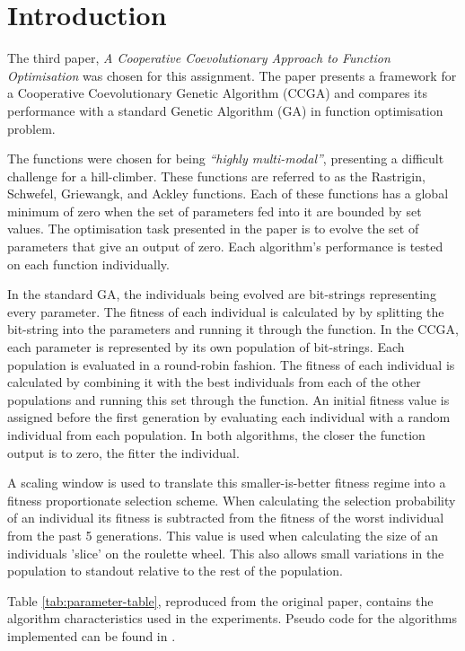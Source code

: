 \section{Introduction} \label{sec:introduction}

The third paper, \textit{A Cooperative Coevolutionary Approach to Function Optimisation}\cite{original-paper} was chosen for this assignment.
The paper presents a framework for a Cooperative Coevolutionary Genetic Algorithm (CCGA) and compares its performance with a standard Genetic Algorithm (GA) in function optimisation problem.

The functions were chosen for being \textit{``highly multi-modal''}, presenting a difficult challenge for a hill-climber.
These functions are referred to as the Rastrigin, Schwefel, Griewangk, and Ackley functions\cite{functions-1,functions-2,functions-3}.
Each of these functions has a global minimum of zero when the set of parameters fed into it are bounded by set values.
The optimisation task presented in the paper is to evolve the set of parameters that give an output of zero.
Each algorithm's performance is tested on each function individually.

In the standard GA, the individuals being evolved are bit-strings representing every parameter.
The fitness of each individual is calculated by by splitting the bit-string into the parameters and running it through the function.
In the CCGA, each parameter is represented by its own population of bit-strings.
Each population is evaluated in a round-robin fashion.
The fitness of each individual is calculated by combining it with the best individuals from each of the other populations and running this set through the function.
An initial fitness value is assigned before the first generation by evaluating each individual with a random individual from each population.
In both algorithms, the closer the function output is to zero, the fitter the individual.

A scaling window is used to translate this smaller-is-better fitness regime into a fitness proportionate selection scheme.
When calculating the selection probability of an individual its fitness is subtracted from the fitness of the worst individual from the past 5 generations.
This value is used when calculating the size of an individuals 'slice' on the roulette wheel.
This also allows small variations in the population to standout relative to the rest of the population.

Table \ref{tab:parameter-table}, reproduced from the original paper, contains the algorithm characteristics used in the experiments.
Pseudo code for the algorithms implemented can be found in \cite{original-paper}.


